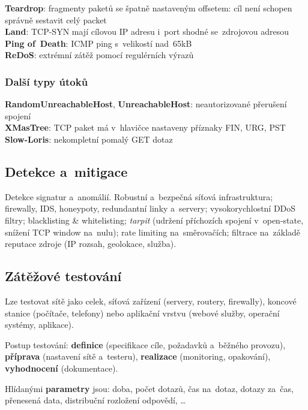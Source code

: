 \textbf{Teardrop}: fragmenty paketů se špatně nastaveným offsetem: cíl není schopen správně sestavit celý packet \\
\textbf{Land}: TCP-SYN mají cílovou IP adresu i~port shodné se~zdrojovou adresou \\
\textbf{Ping of~Death}: ICMP ping s~velikostí nad~65kB \\
\textbf{ReDoS}: extrémní zátěž pomocí regulérních výrazů

\subsubsection{Další typy útoků}

\textbf{RandomUnreachableHost}, \textbf{UnreachableHost}: neautorizované přerušení spojení \\
\textbf{XMasTree}: TCP paket má v~hlavičce nastaveny příznaky FIN, URG, PST \\
\textbf{Slow-Loris}: nekompletní pomalý GET dotaz

\subsection{Detekce a~mitigace}

Detekce signatur a~anomálií. Robustní a~bezpečná síťová infrastruktura; firewally, IDS, honeypoty, redundantní linky a~servery; vysokorychlostní DDoS filtry; blacklisting \& whitelisting; \emph{tarpit} (udržení příchozích spojení v~open-state, snížení TCP window na~nulu); rate limiting na~směrovačích; filtrace na~základě reputace zdroje (IP rozsah, geolokace, služba).

\subsection{Zátěžové testování}

Lze testovat sítě jako celek, síťová zařízení (servery, routery, firewally), koncové stanice (počítače, telefony) nebo aplikační vrstvu (webové služby, operační systémy, aplikace).

Postup testování: \textbf{definice} (specifikace cíle, požadavků a~běžného provozu), \textbf{příprava} (nastavení sítě a~testeru), \textbf{realizace} (monitoring, opakování), \textbf{vyhodnocení} (dokumentace).

Hlídanými \textbf{parametry} jsou: doba, počet dotazů, čas na~dotaz, dotazy za~čas, přenesená data, distribuční rozložení odpovědí, \dots

